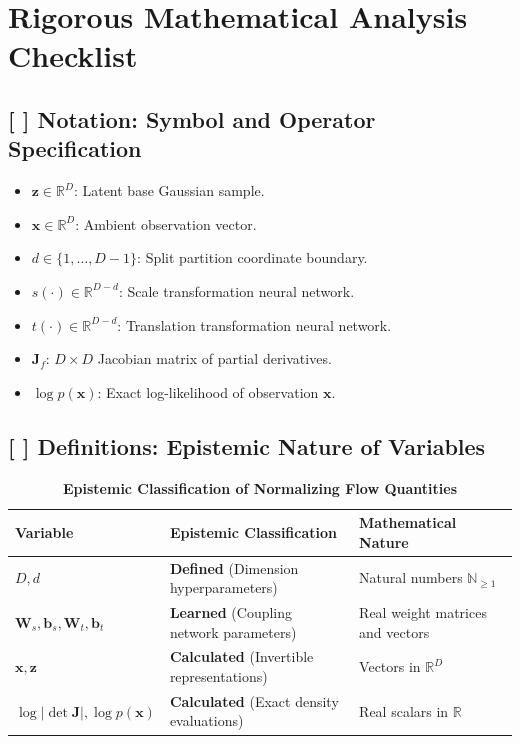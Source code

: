 \documentclass[11pt,a4paper]{article}
\theoremstyle{definition}
\begin{document}
\section{Rigorous Mathematical Analysis Checklist}

\subsection{[ ] Notation: Symbol and Operator Specification}
\begin{itemize}
    \item $\mathbf{z} \in \mathbb{R}^D$: Latent base Gaussian sample.
    \item $\mathbf{x} \in \mathbb{R}^D$: Ambient observation vector.
    \item $d \in \{1, \dots, D-1\}$: Split partition coordinate boundary.
    \item $s(\cdot) \in \mathbb{R}^{D-d}$: Scale transformation neural network.
    \item $t(\cdot) \in \mathbb{R}^{D-d}$: Translation transformation neural network.
    \item $\mathbf{J}_f$: $D \times D$ Jacobian matrix of partial derivatives.
    \item $\log p(\mathbf{x})$: Exact log-likelihood of observation $\mathbf{x}$.
\end{itemize}

\subsection{[ ] Definitions: Epistemic Nature of Variables}
\begin{table}[h]
\centering
\caption{\textbf{Epistemic Classification of Normalizing Flow Quantities}}
\begin{tabular}{lll}
\toprule
\textbf{Variable} & \textbf{Epistemic Classification} & \textbf{Mathematical Nature} \\
\midrule
$D, d$ & \textbf{Defined} (Dimension hyperparameters) & Natural numbers $\mathbb{N}_{\ge 1}$ \\
$\mathbf{W}_s, \mathbf{b}_s, \mathbf{W}_t, \mathbf{b}_t$ & \textbf{Learned} (Coupling network parameters) & Real weight matrices and vectors \\
$\mathbf{x}, \mathbf{z}$ & \textbf{Calculated} (Invertible representations) & Vectors in $\mathbb{R}^D$ \\
$\log |\det \mathbf{J}|, \log p(\mathbf{x})$ & \textbf{Calculated} (Exact density evaluations) & Real scalars in $\mathbb{R}$ \\
\bottomrule
\end{tabular}
\end{table}
\end{document}
